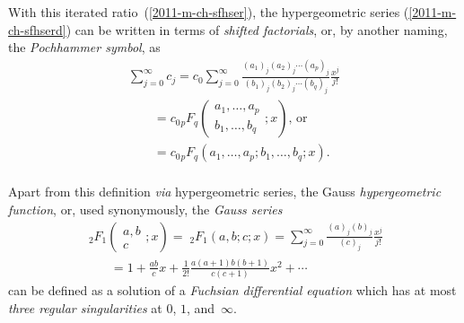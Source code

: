 With this iterated ratio~(\ref{2011-m-ch-sfhser}),
the hypergeometric series (\ref{2011-m-ch-sfhserd}) can be written in terms of
{\em shifted factorials},
or, by another naming,
the
{\em Pochhammer symbol},
as
\begin{equation}
\begin{split}
\sum_{j=0}^\infty c_j
=
 c_0 \sum_{j=0}^\infty  \frac{( a_1)_j( a_2)_j\cdots ( a_p)_j}{( b_1)_j( b_2)_j\cdots ( b_q)_j}
\frac{x^j}{j!}
\\
\qquad =
c_0 {{}_pF_q} \left(
\begin{array}{cc}
a_1,\ldots ,a_p\\
b_1,\ldots ,b_q
\end{array} ; x
\right)     \textrm{, or }\\
\qquad =
c_0 {{}_pF_q} \left(
a_1,\ldots ,a_p;
b_1,\ldots ,b_q
 ; x
\right) .     \\
\end{split}
\label{2011-m-ch-sfhserd1}
\end{equation}

Apart from this definition {\it via}
hypergeometric series, the Gauss {\em hypergeometric function},
or, used synonymously,
the {\em Gauss series}
\begin{equation}
\begin{split}
{\;}_2F_1 \left(
\begin{array}{cc}
a ,b\\
c
\end{array} ; x
\right)
={\;}_2F_1 \left(
a ,b;c ; x
\right)
=   \sum_{j=0}^\infty  \frac{( a)_j( b)_j}{(c)_j} \frac{x^j}{j!}
\\
\qquad
=
1+ \frac{ab}{c} x   + \frac{1}{2!}\frac{a(a+1)b(b+1)}{c(c+1)} x^2
+ \cdots
\end{split}
\end{equation}
can be defined as a solution of a {\em Fuchsian differential equation}
which has at most {\em three regular singularities}
at $0$, $1$, and~$\infty$.

